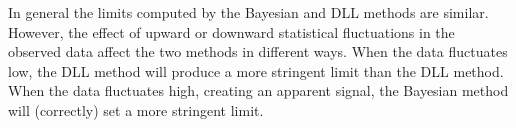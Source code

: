 In general the limits computed by the Bayesian and DLL methods are similar.
However, the effect of upward or downward statistical fluctuations in the
observed data affect the two methods in different ways.  When the data
fluctuates low, the DLL method will produce a more stringent limit than the
DLL method.  When the data fluctuates high, creating an apparent signal, the
Bayesian method will (correctly) set a more stringent limit.  
%

